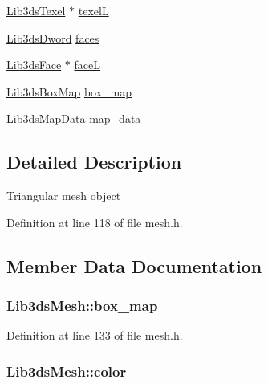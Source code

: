 \begin{DoxyCompactItemize}
\item 
\hyperlink{types_8h_ac64d45b2fb6404f4d3d60c851c786573}{Lib3ds\-Texel} $\ast$ \hyperlink{struct_lib3ds_mesh_a7f25b8f21a652c686feaff0f31c2ad64}{texel\-L}
\item 
\hyperlink{types_8h_a299c9663303144c562f6bd92c2f273d3}{Lib3ds\-Dword} \hyperlink{struct_lib3ds_mesh_af14743c50dc2dccc8bc7e9bab23028fd}{faces}
\item 
\hyperlink{struct_lib3ds_face}{Lib3ds\-Face} $\ast$ \hyperlink{struct_lib3ds_mesh_a4725feec326e5ee7f6856f53484397ac}{face\-L}
\item 
\hyperlink{struct_lib3ds_box_map}{Lib3ds\-Box\-Map} \hyperlink{struct_lib3ds_mesh_a95486a48f02231bd2bfda55168fea692}{box\-\_\-map}
\item 
\hyperlink{struct_lib3ds_map_data}{Lib3ds\-Map\-Data} \hyperlink{struct_lib3ds_mesh_abab3a779231107ce94233813e5c81eee}{map\-\_\-data}
\end{DoxyCompactItemize}


\subsection{Detailed Description}
Triangular mesh object 

Definition at line 118 of file mesh.\-h.



\subsection{Member Data Documentation}
\hypertarget{struct_lib3ds_mesh_a95486a48f02231bd2bfda55168fea692}{
\subsubsection[{box\-\_\-map}]{ Lib3ds\-Mesh\-::box\-\_\-map}}\label{struct_lib3ds_mesh_a95486a48f02231bd2bfda55168fea692}


Definition at line 133 of file mesh.\-h.

\hypertarget{struct_lib3ds_mesh_a20db34abe42b9176bc553cff5d705201}{
\subsubsection[{color}]{ Lib3ds\-Mesh\-::color}}\label{struct_lib3ds_mesh_a20db34abe42b9176bc553cff5d705201}


